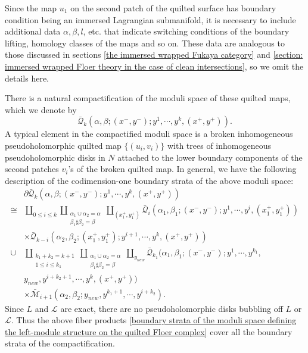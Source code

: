 \documentclass{amsart}
\numberwithin{equation}{section}
\numberwithin{figure}{section}
\begin{document}
	Since the map $u_{1}$ on the second patch of the quilted surface has boundary condition being an immersed Lagrangian submanifold, it is necessary to include additional data $\alpha, \beta, l$, etc. that indicate switching conditions of the boundary lifting, homology classes of the maps and so on. These data are analogous to those discussed in sections \ref{the immersed wrapped Fukaya category} and \ref{section: immersed wrapped Floer theory in the case of clean intersections}, so we omit the details here. \par
	There is a natural compactification of the moduli space of these quilted maps, which we denote by
\begin{equation*}
\bar{\mathcal{Q}}_{k}(\alpha, \beta; (x^{-}, y^{-}); y^{1}, \cdots, y^{k}, (x^{+}, y^{+})).
\end{equation*}
A typical element in the compactified moduli space is a broken inhomogeneous pseudoholomorphic quilted map $\{(u_{i}, v_{i})\}$ with trees of inhomogeneous pseudoholomorphic disks in $N$ attached to the lower boundary components of the second patches $v_{i}$'s of the broken quilted map.
In general, we have the following description of the codimension-one boundary strata of the above moduli space:
\begin{equation}\label{boundary strata of the moduli space defining the left-module structure on the quilted Floer complex}
\begin{split}
&\partial \bar{\mathcal{Q}}_{k}(\alpha, \beta; (x^{-}, y^{-}); y^{1}, \cdots, y^{k}, (x^{+}, y^{+}))\\
\cong &\coprod_{0 \le i \le k} \coprod_{\substack{\alpha_{1} \cup \alpha_{2} = \alpha\\\beta_{1} \sharp \beta_{2} = \beta}} \coprod_{(x^{+}_{1}, y^{+}_{1})}
\bar{\mathcal{Q}}_{i}(\alpha_{1}, \beta_{1}; (x^{-}, y^{-}); y^{1}, \cdots, y^{i}, (x^{+}_{1}, y^{+}_{1}))\\
&\times \bar{\mathcal{Q}}_{k-i}(\alpha_{2}, \beta_{2}; (x^{+}_{1}, y^{+}_{1}); y^{i+1}, \cdots, y^{k}, (x^{+}, y^{+}))\\
\cup &\coprod_{\substack{k_{1} + k_{2} = k+1\\ 1 \le i \le k_{1} }} \coprod_{\substack{\alpha_{1} \cup \alpha_{2} = \alpha\\ \beta_{1} \sharp \beta_{2} = \beta}} \coprod_{y_{new}}
\bar{\mathcal{Q}}_{k_{1}}(\alpha_{1}, \beta_{1}; (x^{-}, y^{-}); y^{1}, \cdots, y^{k_{1}},\\
&y_{new}, y^{i+k_{2}+1}, \cdots, y^{k}, (x^{+}, y^{+}))\\
&\times \bar{\mathcal{M}}_{i+1}(\alpha_{2}, \beta_{2}; y_{new}, y^{k_{1}+1}, \cdots, y^{i+k_{2}}).
\end{split}
\end{equation} 
Since $L$ and $\mathcal{L}$ are exact, there are no pseudoholomorphic disks bubbling off $L$ or $\mathcal{L}$. Thus the above fiber products \eqref{boundary strata of the moduli space defining the left-module structure on the quilted Floer complex} cover all the boundary strata of the compactification. \par
\end{document}
